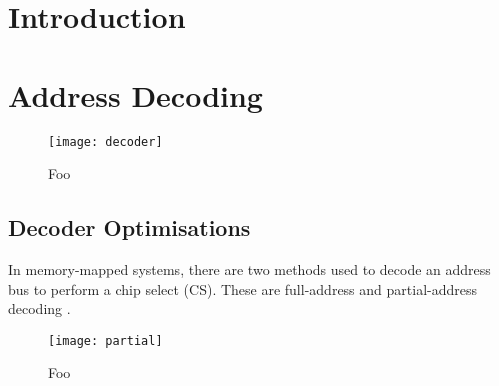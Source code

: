 \section{Introduction}
\lipsum[1]

\section{Address Decoding}
\begin{figure}[H]
\centering
\texttt{[image: decoder]}
\caption{Foo}
\label{fig:multimaster}
\end{figure}

\subsection{Decoder Optimisations}
In memory-mapped systems, there are two methods used to decode an address bus to perform a chip select (CS). These are full-address and partial-address decoding \cite{tanenbaum2016structured}.

\begin{figure}[H]
\centering
\texttt{[image: partial]}
\caption{Foo}
\label{fig:multimaster}
\end{figure}

\newpage
